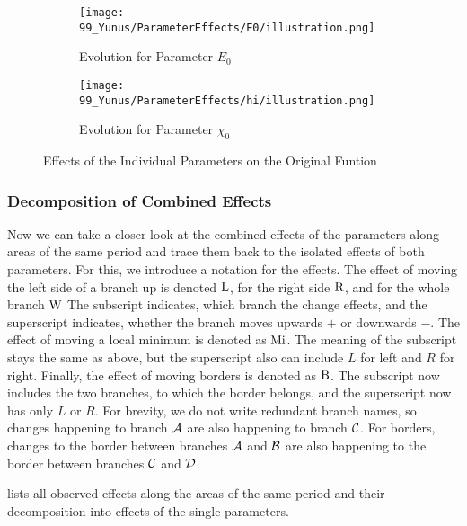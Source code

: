 \begin{figure}
    \centering
    \begin{subfigure}{0.4\textwidth}
        \texttt{[image: 99\_Yunus/ParameterEffects/E0/illustration.png]}
        \caption{Evolution for Parameter $E_0$}
        \label{fig:yunus.function.evolution.e0}
    \end{subfigure}
    \begin{subfigure}{0.4\textwidth}
        \texttt{[image: 99\_Yunus/ParameterEffects/hi/illustration.png]}
        \caption{Evolution for Parameter $\chi_0$}
        \label{fig:yunus.function.evolution.hi}
    \end{subfigure}
    \caption{Effects of the Individual Parameters on the Original Funtion}
\end{figure}

\subsubsection{Decomposition of Combined Effects}

Now we can take a closer look at the combined effects of the parameters along areas of the same period and trace them back to the isolated effects of both parameters.
For this, we introduce a notation for the effects.
The effect of moving the left side of a branch up is denoted $\operatorname{L}$, for the right side $\operatorname{R}$, and for the whole branch $\operatorname{W}$
The subscript indicates, which branch the change effects, and the superscript indicates, whether the branch moves upwards $+$ or downwards $-$.
The effect of moving a local minimum is denoted as $\operatorname{Mi}$.
The meaning of the subscript stays the same as above, but the superscript also can include $L$ for left and $R$ for right.
Finally, the effect of moving borders is denoted as $\operatorname{B}$.
The subscript now includes the two branches, to which the border belongs, and the superscript now has only $L$ or $R$.
For brevity, we do not write redundant branch names, so changes happening to branch $\mathcal{A}$ are also happening to branch $\mathcal{C}$.
For borders, changes to the border between branches $\mathcal{A}$ and $\mathcal{B}$ are also happening to the border between branches $\mathcal{C}$ and $\mathcal{D}$.

 lists all observed effects along the areas of the same period and their decomposition into effects of the single parameters.

